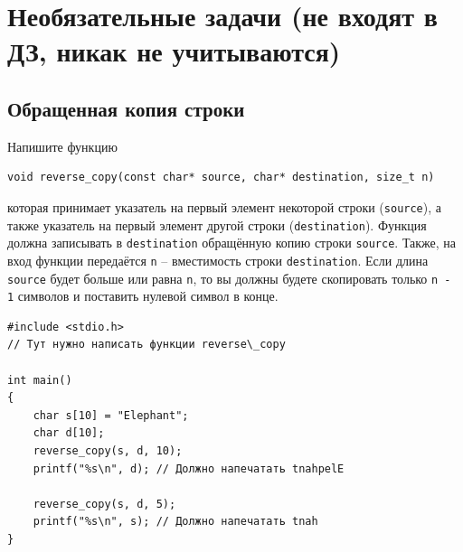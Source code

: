 \documentclass[10pt]{article}
\begin{document}
\newpage
\section*{Необязательные задачи (не входят в ДЗ, никак не учитываются)}
\setcounter{subsection}{0}

\subsection{Обращенная копия строки}
Напишите функцию 
\begin{lstlisting}
void reverse_copy(const char* source, char* destination, size_t n)
\end{lstlisting}
которая принимает указатель на первый элемент некоторой строки (\texttt{source}), а также указатель на первый элемент другой строки (\texttt{destination}). Функция должна записывать в \texttt{destination} обращённую копию строки \texttt{source}. Также, на вход функции передаётся \texttt{n} -- вместимость строки \texttt{destination}. Если длина \texttt{source} будет больше или равна \texttt{n}, то вы должны будете скопировать только \texttt{n - 1} символов и поставить нулевой символ в конце.

\begin{lstlisting}
#include <stdio.h>
// Тут нужно написать функции reverse\_copy

int main() 
{
    char s[10] = "Elephant";
    char d[10];
    reverse_copy(s, d, 10);
    printf("%s\n", d); // Должно напечатать tnahpelE
    
    reverse_copy(s, d, 5);
    printf("%s\n", s); // Должно напечатать tnah
}
\end{lstlisting}


\newpage
\end{document}
